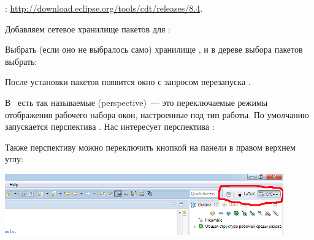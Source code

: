 :
\url{http://download.eclipse.org/tools/cdt/releases/8.4}.

\bigskip Добавляем сетевое хранилище пакетов для \eclipse:

\bigskip{}

\bigskip{}



\bigskip
Выбрать (если оно не выбралось само) хранилище ,
и в дереве выбора пакетов выбрать:

\bigskip
{}

\bigskip
{}

\bigskip После установки пакетов появится окно с запросом перезапуска \eclipse.

\bigskip
В \eclipse\ есть так называемые  (perspective)\ --- это
переключаемые режимы отображения рабочего набора окон, настроенные под тип
работы. По умолчанию запускается перспектива . Нас
интересует перспектива :

\bigskip{}

\bigskip Также перспективу можно переключить кнопкой на панели в правом верхнем
углу:

\bigskip\includegraphics[width=0.9\textwidth]{fig/eclperpective.png}


